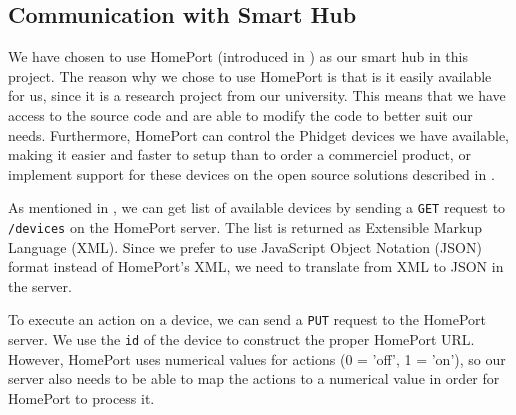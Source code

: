 \subsection{Communication with Smart Hub}
We have chosen to use HomePort (introduced in ) as our smart hub in this project.
The reason why we chose to use HomePort is that is it easily available for us, 
since it is a research project from our university. 
This means that we have access to the source code and are able to modify the code to better suit our needs. 
Furthermore, HomePort can control the Phidget devices we have available, 
making it easier and faster to setup than to order a commerciel product, 
or implement support for these devices on the open source solutions described in . 

As mentioned in , we can get list of available devices by sending a \texttt{GET} request to \texttt{/devices} on the HomePort server. 
The list is returned as Extensible Markup Language (XML). 
Since we prefer to use JavaScript Object Notation (JSON) format instead of HomePort's XML, 
we need to translate from XML to JSON in the server. 

To execute an action on a device, we can send a \texttt{PUT} request to the HomePort server. 
We use the \texttt{id} of the device to construct the proper HomePort URL. 
However, HomePort uses numerical values for actions (0 = 'off', 1 = 'on'), 
so our server also needs to be able to map the actions to a numerical value in order for HomePort to process it. 
